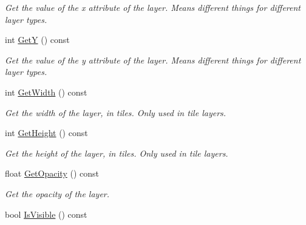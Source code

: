 \begin{DoxyCompactItemize}
\begin{DoxyCompactList}\small\item\em Get the value of the x attribute of the layer. Means different things for different layer types. \end{DoxyCompactList}\item 
\hypertarget{classTmx_1_1Layer_aa65a3ed0d53c60ab0356e256b3553c3d}{int \hyperlink{classTmx_1_1Layer_aa65a3ed0d53c60ab0356e256b3553c3d}{Get\-Y} () const }\label{classTmx_1_1Layer_aa65a3ed0d53c60ab0356e256b3553c3d}

\begin{DoxyCompactList}\small\item\em Get the value of the y attribute of the layer. Means different things for different layer types. \end{DoxyCompactList}\item 
\hypertarget{classTmx_1_1Layer_a199a01de350b86975e9473a9aa491de4}{int \hyperlink{classTmx_1_1Layer_a199a01de350b86975e9473a9aa491de4}{Get\-Width} () const }\label{classTmx_1_1Layer_a199a01de350b86975e9473a9aa491de4}

\begin{DoxyCompactList}\small\item\em Get the width of the layer, in tiles. Only used in tile layers. \end{DoxyCompactList}\item 
\hypertarget{classTmx_1_1Layer_a6f8cf75b8249eb4c1e62256cde828183}{int \hyperlink{classTmx_1_1Layer_a6f8cf75b8249eb4c1e62256cde828183}{Get\-Height} () const }\label{classTmx_1_1Layer_a6f8cf75b8249eb4c1e62256cde828183}

\begin{DoxyCompactList}\small\item\em Get the height of the layer, in tiles. Only used in tile layers. \end{DoxyCompactList}\item 
\hypertarget{classTmx_1_1Layer_a093f75d1b7e5afbdf4ce3c3efcdc8182}{float \hyperlink{classTmx_1_1Layer_a093f75d1b7e5afbdf4ce3c3efcdc8182}{Get\-Opacity} () const }\label{classTmx_1_1Layer_a093f75d1b7e5afbdf4ce3c3efcdc8182}

\begin{DoxyCompactList}\small\item\em Get the opacity of the layer. \end{DoxyCompactList}\item 
\hypertarget{classTmx_1_1Layer_a231832ce15394aa1c6b1a61db561a8dd}{bool \hyperlink{classTmx_1_1Layer_a231832ce15394aa1c6b1a61db561a8dd}{Is\-Visible} () const }\label{classTmx_1_1Layer_a231832ce15394aa1c6b1a61db561a8dd}


\end{DoxyCompactItemize}
